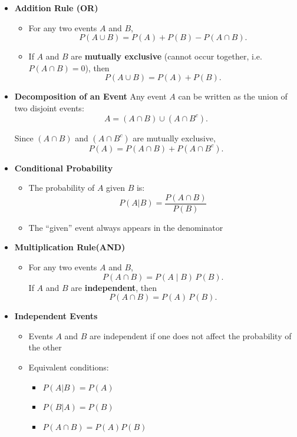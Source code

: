 \documentclass{article}
\begin{document}
\begin{itemize}
  
  \item \textbf{Addition Rule (OR)}
  \begin{itemize}
      \item 
For any two events $A$ and $B$,
\[
P(A \cup B) = P(A) + P(B) - P(A \cap B).
\]

    \item If $A$ and $B$ are \textbf{mutually exclusive} (cannot occur together, i.e. $P(A \cap B) = 0$), then
\[
P(A \cup B) = P(A) + P(B).
\]
  \end{itemize}

  \item \textbf{Decomposition of an Event}
    Any event $A$ can be written as the union of two disjoint events:
    \[
    A = (A \cap B) \cup (A \cap B^c).
    \]
    
    Since $(A \cap B)$ and $(A \cap B^c)$ are mutually exclusive,
    \[
    P(A) = P(A \cap B) + P(A \cap B^c).
    \]



  \item \textbf{Conditional Probability}
  \begin{itemize}
    \item The probability of $A$ given $B$ is:
    \[
      P(A|B) = \frac{P(A \cap B)}{P(B)}
    \]
    \item The ``given'' event always appears in the denominator
  \end{itemize}

  \item \textbf{Multiplication Rule(AND)}
  \begin{itemize}
    \item  For any two events $A$ and $B$,
    \[P(A \cap B) = P(A \mid B)\,P(B).\]
    \itme If $A$ and $B$ are \textbf{independent}, then
    \[P(A \cap B) = P(A)\,P(B).\]
  \end{itemize}

  \item \textbf{Independent Events}
  \begin{itemize}
    \item Events $A$ and $B$ are independent if one does not affect the probability of the other
    \item Equivalent conditions:
    \begin{itemize}
      \item $P(A|B) = P(A)$
      \item $P(B|A) = P(B)$
      \item $P(A \cap B) = P(A)P(B)$
    \end{itemize}
  \end{itemize}
  



\end{itemize}
\end{document}

